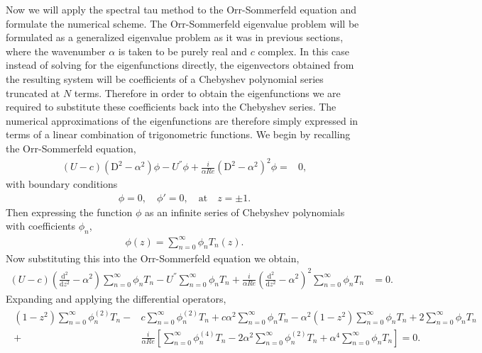 \documentclass[a4paper, 12pt, twoside, openright]{article}
\numberwithin{equation}{section}
\begin{document}
Now we will apply the spectral tau method to the Orr-Sommerfeld equation and formulate the numerical scheme. The Orr-Sommerfeld eigenvalue problem will be formulated as a generalized eigenvalue problem as it was in previous sections, where the wavenumber $\alpha$ is taken to be purely real and $c$ complex. In this case instead of solving for the eigenfunctions directly, the eigenvectors obtained from the resulting system will be coefficients of a Chebyshev polynomial series truncated at $N$ terms. Therefore in order to obtain the eigenfunctions we are required to substitute these coefficients back into the Chebyshev series. The numerical approximations of the eigenfunctions are therefore simply expressed in terms of a linear combination of trigonometric functions. We begin by recalling the Orr-Sommerfeld equation,
\begin{align}
\left(U-c\right)\left(\mathrm{D}^2 - \alpha^2\right)\phi  - U^{''}\phi + \frac{i}{\alpha Re} \left(\mathrm{D}^2 - \alpha^2\right)^2 \phi =& 0,
\end{align}
with boundary conditions 
\begin{align}
\phi=0,\quad \phi'=0, \quad \text{at} \quad z=\pm1.
\end{align} 
Then expressing the function $\phi$ as an infinite series of Chebyshev polynomials with coefficients $\phi_n$,
\begin{align}
\phi(z) = \sum_{n=0}^{\infty}\phi_n T_n(z).
\end{align}
Now substituting this into the Orr-Sommerfeld equation we obtain,
\begin{align}
\left(U-c\right)\left(\frac{\mathrm{d^2}}{\mathrm{d}z^2} - \alpha^2\right)\sum_{n=0}^{\infty}\phi_n T_n  - U^{''}\sum_{n=0}^{\infty}\phi_n T_n + \frac{i}{\alpha Re}\left(\frac{\mathrm{d^2}}{\mathrm{d}z^2} - \alpha^2\right)^2 \sum_{n=0}^{\infty}\phi_n T_n &= 0. 
\end{align}
Expanding and applying the differential operators,
\begin{align}
\begin{split}
(1-z^2)\sum_{n=0}^{\infty}\phi_n^{(2)} T_n -& c\sum_{n=0}^{\infty}\phi_n^{(2)} T_n + c\alpha^2\sum_{n=0}^{\infty}\phi_n T_n - \alpha^2(1-z^2)\sum_{n=0}^{\infty}\phi_n T_n + 2\sum_{n=0}^{\infty}\phi_n T_n \\ + &\frac{i}{\alpha Re}\left[\sum_{n=0}^{\infty}\phi_n^{(4)} T_n - 2\alpha^2\sum_{n=0}^{\infty}\phi_n^{(2)} T_n + \alpha^4\sum_{n=0}^{\infty}\phi_n T_n \right] = 0. \label{eq:OS_spectral}
\end{split}
\end{align}
\end{document}
